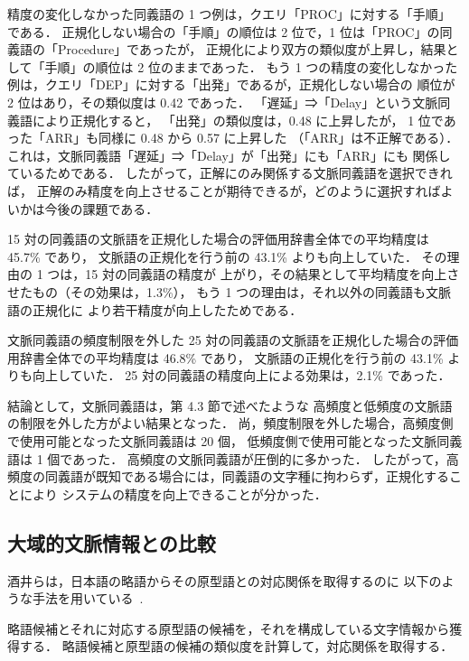 \documentclass[japanese]{jnlp_1.4}
\begin{document}
精度の変化しなかった同義語の 1 つ例は，クエリ「PROC」に対する「手順」である．
正規化しない場合の「手順」の順位は 2 位で，1 位は「PROC」の同義語の「Procedure」であったが，
正規化により双方の類似度が上昇し，結果として「手順」の順位は 2 位のままであった．
もう 1 つの精度の変化しなかった例は，クエリ「DEP」に対する「出発」であるが，正規化しない場合の
順位が 2 位はあり，その類似度は 0.42 であった．
「遅延」⇒「Delay」という文脈同義語により正規化すると，
「出発」の類似度は，0.48 に上昇したが，
1 位であった「ARR」も同様に 0.48 から 0.57 に上昇した
（「ARR」は不正解である）．
これは，文脈同義語「遅延」⇒「Delay」が「出発」にも「ARR」にも
関係しているためである．
したがって，正解にのみ関係する文脈同義語を選択できれば，
正解のみ精度を向上させることが期待できるが，どのように選択すればよいかは今後の課題である．

15 対の同義語の文脈語を正規化した場合の評価用辞書全体での平均精度は 45.7\% であり，
文脈語の正規化を行う前の 43.1\% よりも向上していた．
その理由の 1 つは，15 対の同義語の精度が
上がり，その結果として平均精度を向上させたもの（その効果は，1.3\%），
もう 1 つの理由は，それ以外の同義語も文脈語の正規化に
より若干精度が向上したためである．

文脈同義語の頻度制限を外した 25 対の同義語の文脈語を正規化した場合の評価用辞書全体での平均精度は 46.8\% であり，
文脈語の正規化を行う前の 43.1\% よりも向上していた．
25 対の同義語の精度向上による効果は，2.1\% であった．

結論として，文脈同義語は，第 4.3 節で述べたような
高頻度と低頻度の文脈語の制限を外した方がよい結果となった．
尚，頻度制限を外した場合，高頻度側で使用可能となった文脈同義語は 20 個，
低頻度側で使用可能となった文脈同義語は 1 個であった．
高頻度の文脈同義語が圧倒的に多かった．
したがって，高頻度の同義語が既知である場合には，同義語の文字種に拘わらず，正規化することにより
システムの精度を向上できることが分かった．



\subsection{大域的文脈情報との比較}

酒井らは，日本語の略語からその原型語との対応関係を取得するのに
以下のような手法を用いている~\cite{sakai05}. 

略語候補とそれに対応する原型語の候補を，それを構成している文字情報から獲得する．
略語候補と原型語の候補の類似度を計算して，対応関係を取得する．
\end{document}
